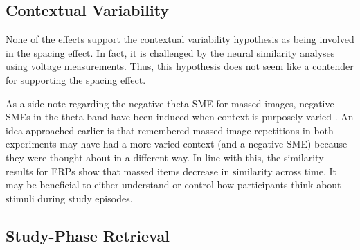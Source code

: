 
\subsection{Contextual Variability}



None of the effects support the contextual variability hypothesis as being involved in the spacing effect.  In fact, it is challenged by the neural similarity analyses using voltage measurements.  Thus, this hypothesis does not seem like a contender for supporting the spacing effect.

As a side note regarding the negative theta SME for massed images, negative SMEs in the theta band have been induced when context is purposely varied \cite{StauHans2013}.  An idea approached earlier is that remembered massed image repetitions in both experiments may have had a more varied context (and a negative SME) because they were thought about in a different way.   In line with this, the similarity results for ERPs show that massed items decrease in similarity across time.  It may be beneficial to either understand or control how participants think about stimuli during study episodes.



\subsection{Study-Phase Retrieval}


